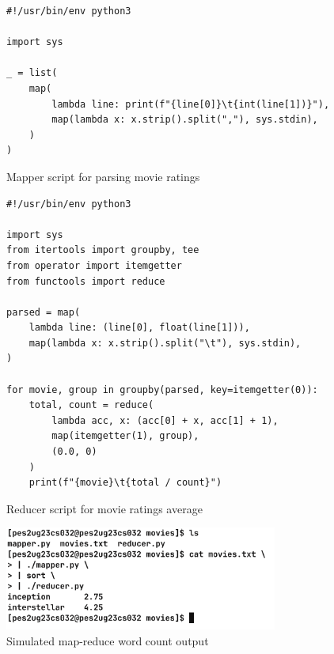\documentclass[12pt,a4paper]{article}
\begin{document}
\begin{figure}[H]
   \centering
   \begin{verbatim}
#!/usr/bin/env python3

import sys

_ = list(
    map(
        lambda line: print(f"{line[0]}\t{int(line[1])}"),
        map(lambda x: x.strip().split(","), sys.stdin),
    )
)
   \end{verbatim}
   \caption{Mapper script for parsing movie ratings}
\end{figure}

\begin{figure}[H]
   \centering
   \begin{verbatim}
#!/usr/bin/env python3

import sys
from itertools import groupby, tee
from operator import itemgetter
from functools import reduce

parsed = map(
    lambda line: (line[0], float(line[1])),
    map(lambda x: x.strip().split("\t"), sys.stdin),
)

for movie, group in groupby(parsed, key=itemgetter(0)):
    total, count = reduce(
        lambda acc, x: (acc[0] + x, acc[1] + 1), 
        map(itemgetter(1), group), 
        (0.0, 0)
    )
    print(f"{movie}\t{total / count}")
   \end{verbatim}
   \caption{Reducer script for movie ratings average}
\end{figure}

\begin{figure}[H]
   \centering
   \includegraphics[width=0.8\textwidth]{./images/img6.png} 
   \caption{Simulated map-reduce word count output}
\end{figure}
\end{document}
